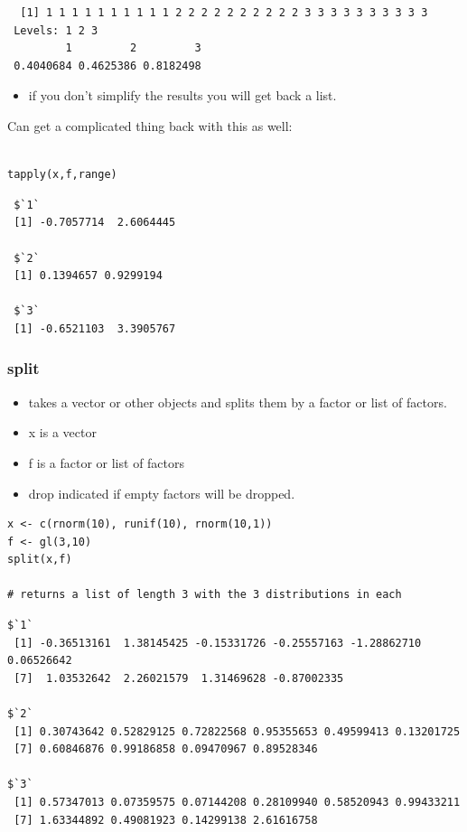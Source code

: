 \documentclass[11pt]{article}
\begin{document}
\begin{verbatim}
  [1] 1 1 1 1 1 1 1 1 1 1 2 2 2 2 2 2 2 2 2 2 3 3 3 3 3 3 3 3 3 3
 Levels: 1 2 3
         1         2         3 
 0.4040684 0.4625386 0.8182498
\end{verbatim}

\begin{itemize}
\item if you don't simplify the results you will get back a list.
\end{itemize}

Can get a complicated thing back with this as well:

\begin{verbatim}

tapply(x,f,range)
\end{verbatim}

\begin{verbatim}
 $`1`
 [1] -0.7057714  2.6064445
 
 $`2`
 [1] 0.1394657 0.9299194
 
 $`3`
 [1] -0.6521103  3.3905767
\end{verbatim}
\subsubsection{split}
\label{sec-2-4-6}

\begin{itemize}
\item takes a vector or other objects and splits them by a factor or list
  of factors.
\item x is a vector
\item f is a factor or list of factors
\item drop indicated if empty factors will be dropped.
\end{itemize}


\begin{verbatim}
x <- c(rnorm(10), runif(10), rnorm(10,1))
f <- gl(3,10)
split(x,f)

# returns a list of length 3 with the 3 distributions in each
\end{verbatim}


\begin{verbatim}
$`1`
 [1] -0.36513161  1.38145425 -0.15331726 -0.25557163 -1.28862710  0.06526642
 [7]  1.03532642  2.26021579  1.31469628 -0.87002335

$`2`
 [1] 0.30743642 0.52829125 0.72822568 0.95355653 0.49599413 0.13201725
 [7] 0.60846876 0.99186858 0.09470967 0.89528346

$`3`
 [1] 0.57347013 0.07359575 0.07144208 0.28109940 0.58520943 0.99433211
 [7] 1.63344892 0.49081923 0.14299138 2.61616758
\end{verbatim}
\end{document}
